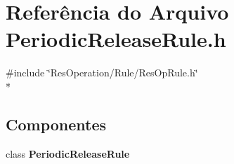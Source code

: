 \section{Referência do Arquivo Periodic\+Release\+Rule.\+h}
\label{_rule_2_periodic_release_2_periodic_release_rule_8h}
{\ttfamily \#include \char`\"{}Res\+Operation/\+Rule/\+Res\+Op\+Rule.\+h\char`\"{}}\\*
\subsection*{Componentes}
\begin{DoxyCompactItemize}
\item 
class {\bf Periodic\+Release\+Rule}
\end{DoxyCompactItemize}
